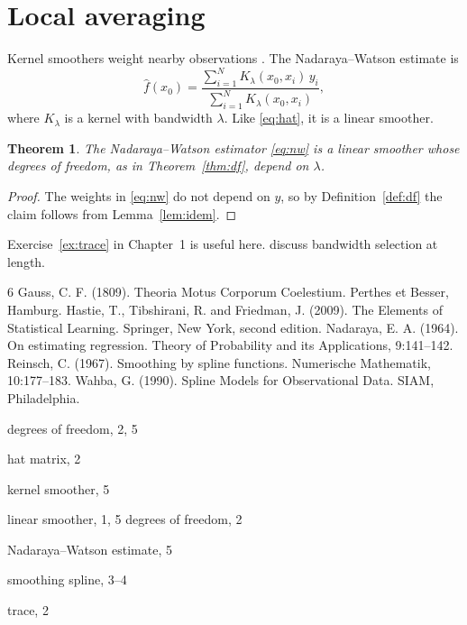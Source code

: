 \documentclass[11pt]{book}
\newtheorem{theorem}{Theorem}[chapter]
\theoremstyle{definition}
\numberwithin{equation}{chapter}
\begin{document}
\section{Local averaging}
Kernel smoothers weight nearby observations \citep{nadaraya1964}. The Nadaraya--Watson estimate is
\begin{equation}\label{eq:nw}
\hat f(x_0) = \frac{\sum_{i=1}^{N} K_\lambda(x_0, x_i)\, y_i}{\sum_{i=1}^{N} K_\lambda(x_0, x_i)} ,
\end{equation}
where $K_\lambda$ is a kernel with bandwidth $\lambda$. Like \eqref{eq:hat}, it is a linear smoother.
\begin{theorem}\label{thm:nw}
The Nadaraya--Watson estimator \eqref{eq:nw} is a linear smoother whose degrees of freedom, as in Theorem~\ref{thm:df}, depend on $\lambda$.
\end{theorem}
\begin{proof}
The weights in \eqref{eq:nw} do not depend on $y$, so by Definition~\ref{def:df} the claim follows from Lemma~\ref{lem:idem}.
\end{proof}
Exercise~\ref{ex:trace} in Chapter~1 is useful here. \citet{hastie2009} discuss bandwidth selection at length.

\backmatter

\begin{thebibliography}{6}
 Gauss, C. F. (1809). Theoria Motus Corporum Coelestium. Perthes et Besser, Hamburg.
 Hastie, T., Tibshirani, R. and Friedman, J. (2009). The Elements of Statistical Learning. Springer, New York, second edition.
 Nadaraya, E. A. (1964). On estimating regression. Theory of Probability and its Applications, 9:141--142.
 Reinsch, C. (1967). Smoothing by spline functions. Numerische Mathematik, 10:177--183.
 Wahba, G. (1990). Spline Models for Observational Data. SIAM, Philadelphia.
\end{thebibliography}
\begin{theindex}
\item degrees of freedom, 2, 5
\item hat matrix, 2
\item kernel smoother, 5
\item linear smoother, 1, 5
\subitem degrees of freedom, 2
\item Nadaraya--Watson estimate, 5
\item smoothing spline, 3--4
\item trace, 2
\end{theindex}
\end{document}
